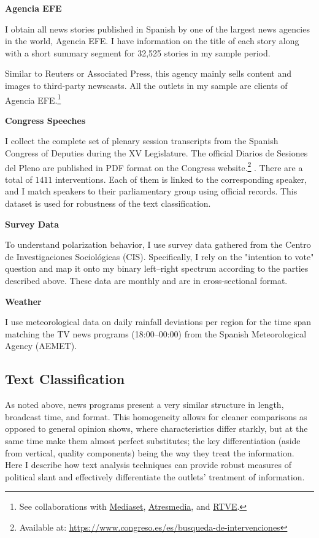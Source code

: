 \documentclass[12pt]{article}
\begin{document}
	
	\textbf{Agencia EFE}
	
	I obtain all news stories published in Spanish by one of the largest news agencies in the world, Agencia EFE. I have information on the title of each story along with a short summary segment for  32,525 stories in my sample period.
	
	Similar to Reuters or Associated Press, this agency mainly sells content and images to third-party newscasts. All the outlets in my sample are clients of Agencia EFE.\footnote{See collaborations with \href{https://www.telecinco.es/autores/agencia-efe/}{Mediaset}, \href{https://cadenaser.com/nacional/2024/09/22/el-teletexto-una-herramienta-olvidada-que-aun-perdura-en-nuestras-televisiones-cadena-ser/}{Atresmedia}, and \href{https://www.rtve.es/rtve/20130301/rtve-agencia-efe-firman-convenio-colaboracion/611440.shtml}{RTVE}.} 


	\textbf{Congress Speeches}

 I collect the complete set of plenary session transcripts from the Spanish Congress of Deputies during the XV Legislature. The official Diarios de Sesiones del Pleno are published in PDF format on the Congress website.\footnote{Available at: \url{https://www.congreso.es/es/busqueda-de-intervenciones}} . There are a total of $1411$ interventions. Each of them is linked to the corresponding speaker, and I match speakers to their parliamentary group using official records. This dataset is used for robustness of the text classification. 

	
	\textbf{Survey Data}
	
	To understand polarization behavior, I use survey data gathered from the Centro de Investigaciones Sociológicas (CIS). Specifically, I rely on the "intention to vote" question and map it onto my binary left–right spectrum according to the parties described above. These data are monthly and are in cross-sectional format.
	
	\textbf{Weather}
	
	I use meteorological data on daily rainfall deviations per region for the time span matching the TV news programs (18:00–00:00) from the Spanish Meteorological Agency (AEMET).
	

	
	
	
	\subsection{Text Classification}
	
	As noted above,  news programs present a very similar structure in length, broadcast time, and format. This homogeneity allows for cleaner comparisons as opposed to general opinion shows, where characteristics differ starkly, but at the same time make them almost perfect substitutes; the key differentiation (aside from vertical, quality components) being the way they treat the information. Here I describe how text analysis techniques can provide robust measures of political slant and effectively differentiate the outlets' treatment of  information. 
	
\end{document}

